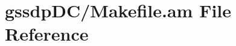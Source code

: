 \hypertarget{gssdp_d_c_2_makefile_8am}{\section{gssdp\+D\+C/\+Makefile.am File Reference}
\label{gssdp_d_c_2_makefile_8am}
}
